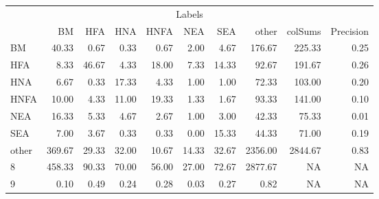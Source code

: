 \begin{table}
\centering\begingroup\fontsize{11}{13}\selectfont

\begin{tabular}{lrrrrrr>{}r|rr}
\toprule
\multicolumn{10}{c}{Labels} \\
\cmidrule(l{3pt}r{3pt}){1-10}
  & BM & HFA & HNA & HNFA & NEA & SEA & other & colSums & Precision\\
\midrule
BM & 40.33 & 0.67 & 0.33 & 0.67 & 2.00 & 4.67 & 176.67 & 225.33 & 0.25\\
HFA & 8.33 & 46.67 & 4.33 & 18.00 & 7.33 & 14.33 & 92.67 & 191.67 & 0.26\\
HNA & 6.67 & 0.33 & 17.33 & 4.33 & 1.00 & 1.00 & 72.33 & 103.00 & 0.20\\
HNFA & 10.00 & 4.33 & 11.00 & 19.33 & 1.33 & 1.67 & 93.33 & 141.00 & 0.10\\
NEA & 16.33 & 5.33 & 4.67 & 2.67 & 1.00 & 3.00 & 42.33 & 75.33 & 0.01\\
\addlinespace
SEA & 7.00 & 3.67 & 0.33 & 0.33 & 0.00 & 15.33 & 44.33 & 71.00 & 0.19\\
other & 369.67 & 29.33 & 32.00 & 10.67 & 14.33 & 32.67 & 2356.00 & 2844.67 & 0.83\\
8 & 458.33 & 90.33 & 70.00 & 56.00 & 27.00 & 72.67 & 2877.67 & NA & NA\\
9 & 0.10 & 0.49 & 0.24 & 0.28 & 0.03 & 0.27 & 0.82 & NA & NA\\
\bottomrule
\end{tabular}
\endgroup{}
\end{table}
